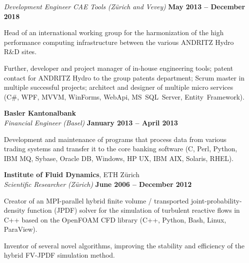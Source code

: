 \documentclass[line,11pt,a4paper]{resume}
\begin{document}
\begin{resume}
\textsl{Development Engineer CAE Tools (Zürich and Vevey)}
  \hfill \textbf{May 2013 -- December 2018}\\
\vspace{-4mm}%
\begin{list2}
  \item Head of an international working group for the harmonization of the
    high performance computing infrastructure between the various ANDRITZ Hydro
    R\&D sites.

  \item Further, developer and project manager of in-house engineering tools;
    patent contact for ANDRITZ Hydro to the group patents department; Scrum
    master in multiple successful projects; architect and designer of multiple
    micro services (C\#, WPF, MVVM, WinForms, WebApi, MS~SQL~Server,
    Entity~Framework).
\end{list2}

\textbf{Basler Kantonalbank}\\\vspace{1mm}%
\textsl{Financial Engineer (Basel)}
  \hfill \textbf{January 2013 -- April 2013}\\
\vspace{-4mm}%
\begin{list2}
  \item Development and maintenance of programs that process data from various
    trading systems and transfer it to the core banking software (C, Perl,
    Python, IBM MQ, Sybase, Oracle DB, Windows, HP UX, IBM AIX, Solaris, RHEL).
\end{list2}

\textbf{Institute of Fluid Dynamics}, ETH Z\"urich\\\vspace{1mm}%
\textsl{Scientific Researcher (Zürich)}
  \hfill \textbf{June 2006 -- December 2012}\\
\vspace{-4mm}%
\begin{list2}
  \item Creator of an MPI-parallel hybrid finite volume / transported
    joint-probability-density function (JPDF) solver for the simulation of
    turbulent reactive flows in C++ based on the OpenFOAM CFD library (C++,
    Python, Bash, Linux, ParaView).

  \item Inventor of several novel algorithms, improving the stability and
    efficiency of the hybrid FV-JPDF simulation method.
\end{list2}


\end{resume}
\end{document}
